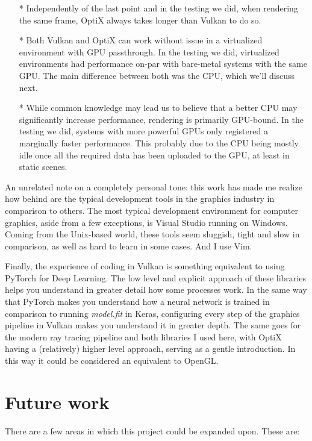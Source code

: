 \begin{itemize}
  \item[*]{Independently of the last point and in the testing we did, when rendering the same frame, OptiX always takes longer than Vulkan to do so.}
  \item[*]{Both Vulkan and OptiX can work without issue in a virtualized environment with GPU passthrough. In the testing we did, virtualized environments had performance on-par with bare-metal systems with the same GPU. The main difference between both was the CPU, which we'll discuss next.}
  \item[*]{While common knowledge may lead us to believe that a better CPU may significantly increase performance, rendering is primarily GPU-bound. In the testing we did, systems with more powerful GPUs only registered a marginally faster performance. This probably due to the CPU being mostly idle once all the required data has been uploaded to the GPU, at least in static scenes.}
\end{itemize}

An unrelated note on a completely personal tone: this work has made me realize how behind are the typical development tools in the graphics industry in comparison to others. The most typical development environment for computer graphics, aside from a few exceptions, is Visual Studio running on Windows. Coming from the Unix-based world, these tools seem sluggish, tight and slow in comparison, as well as hard to learn in some cases. And I use Vim.

Finally, the experience of coding in Vulkan is something equivalent to using PyTorch for Deep Learning. The low level and explicit approach of these libraries helps you understand in greater detail how some processes work. In the same way that PyTorch makes you understand how a neural network is trained in comparison to running \textit{model.fit} in Keras, configuring every step of the graphics pipeline in Vulkan makes you understand it in greater depth. The same goes for the modern ray tracing pipeline and both libraries I used here, with OptiX having a (relatively) higher level approach, serving as a gentle introduction. In this way it could be considered an equivalent to OpenGL.

\section{Future work}

There are a few areas in which this project could be expanded upon. These are:

